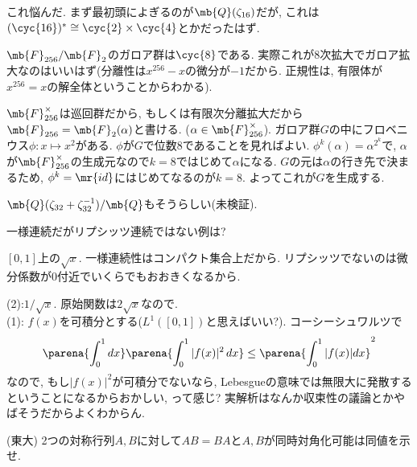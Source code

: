 \begin{ans} これ悩んだ. まず最初頭によぎるのが$\mb{Q}(\zeta_{16})$だが, これは$(\cyc{16})^{\ast}\cong \cyc{2}\times \cyc{4}$とかだったはず. \par 
$\mb{F}_{256}/\mb{F}_{2}$のガロア群は$\cyc{8}$である. 実際これが8次拡大でガロア拡大なのはいいはず(分離性は$x^{256}-x$の微分が$-1$だから. 正規性は, 有限体が$x^{256}=x$の解全体ということからわかる). \par 
$\mb{F}_{256}^{\times}$は巡回群だから, もしくは有限次分離拡大だから$\mb{F}_{256} = \mb{F}_{2}(\alpha)$と書ける. ($\alpha\in \mb{F}_{256}^{\times}$). 
ガロア群$G$の中にフロベニウス$\phi:x\mapsto x^2$がある. $\phi$が$G$で位数8であることを見ればよい. $\phi^{k}(\alpha) = \alpha^{2^k}$で, $\alpha$が$\mb{F}_{256}^{\times}$の生成元なので$k=8$ではじめて$\alpha$になる. $G$の元は$\alpha$の行き先で決まるため, $\phi^{k}=\mr{id}$にはじめてなるのが$k=8$. よってこれが$G$を生成する. 
\end{ans}
\begin{ans}
$\mb{Q}(\zeta_{32}+\zeta_{32}^{-1}) / \mb{Q}$もそうらしい(未検証). 
\end{ans}


\begin{prob}
一様連続だがリプシッツ連続ではない例は?
\end{prob}
\begin{ans}
$[0,1]$上の$\sqrt{x}$. 一様連続性はコンパクト集合上だから. リプシッツでないのは微分係数が$0$付近でいくらでもおおきくなるから. 
\end{ans}

\begin{prob}
\end{prob}
\begin{ans}
(2):$1/\sqrt{x}$. 原始関数は$2\sqrt{x}$なので. \\
(1): $f(x)$を可積分とする($L^1([0,1])$と思えばいい?). コーシーシュワルツで
\[\parena{\int_{0}^{1} dx}\parena{\int_{0}^{1} |f(x)|^2\, dx} \leq \parena{\int_{0}^{1} |f(x)|dx }^2\]
なので, もし$|f(x)|^2$が可積分でないなら, Lebesgueの意味では無限大に発散するということになるからおかしい, って感じ? 実解析はなんか収束性の議論とかやばそうだからよくわからん.
\end{ans}

\begin{prob} (東大) 2つの対称行列$A,B$に対して$AB=BA$と$A,B$が同時対角化可能は同値を示せ. 
\end{prob}

